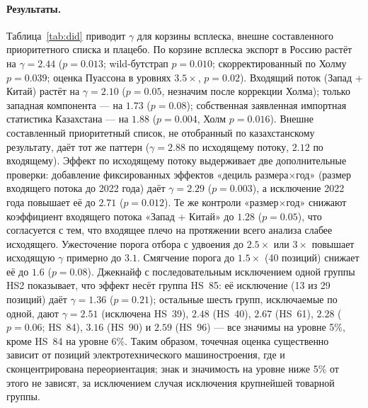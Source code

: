 \documentclass[12pt]{article}
\begin{document}
\paragraph{Результаты.} Таблица~\ref{tab:did} приводит $\gamma$ для корзины всплеска,
внешне составленного приоритетного списка и плацебо. По корзине всплеска экспорт в Россию
растёт на $\gamma = 2.44$ ($p = 0.013$; wild-бутстрап $p = 0.010$; скорректированный по
Холму $p = 0.039$; оценка Пуассона в уровнях $3.5\times$, $p = 0.02$). Входящий поток
(Запад + Китай) растёт на $\gamma = 2.10$ ($p = 0.05$, незначим после коррекции Холма);
только западная компонента — на $1.73$ ($p = 0.08$); собственная заявленная импортная
статистика Казахстана — на $1.88$ ($p = 0.004$, Холм $p = 0.016$). Внешне составленный
приоритетный список, не отобранный по казахстанскому результату, даёт тот же паттерн
($\gamma = 2.88$ по исходящему потоку, $2.12$ по входящему). Эффект по исходящему потоку
выдерживает две дополнительные проверки: добавление фиксированных эффектов
«дециль размера$\times$год» (размер входящего потока до 2022 года) даёт
$\gamma = 2.29$ ($p = 0.003$), а исключение 2022 года повышает её до $2.71$ ($p = 0.012$).
Те же контроли «размер$\times$год» снижают коэффициент входящего потока «Запад + Китай» до
$1.28$ ($p = 0.05$), что согласуется с тем, что входящее плечо на протяжении всего анализа
слабее исходящего. Ужесточение порога отбора с удвоения до $2.5\times$ или $3\times$
повышает исходящую $\gamma$ примерно до $3.1$. Смягчение порога до $1.5\times$ (40 позиций)
снижает её до $1.6$ ($p = 0.08$). Джекнайф с последовательным исключением одной группы HS2
показывает, что эффект несёт группа HS~85: её исключение (13 из 29 позиций) даёт
$\gamma = 1.36$ ($p = 0.21$); остальные шесть групп, исключаемые по одной, дают
$\gamma = 2.51$ (исключена HS~39), $2.48$ (HS~40), $2.67$ (HS~61), $2.28$ ($p = 0.06$;
HS~84), $3.16$ (HS~90) и $2.59$ (HS~96) — все значимы на уровне 5\%, кроме HS~84 на уровне
6\%. Таким образом, точечная оценка существенно зависит от позиций электротехнического
машиностроения, где и сконцентрирована переориентация; знак и значимость на уровне ниже 5\%
от этого не зависят, за исключением случая исключения крупнейшей товарной группы.
\end{document}
